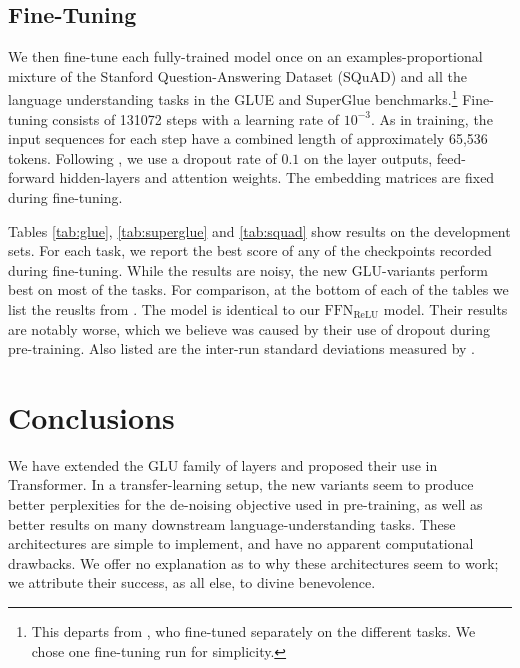 \subsection{Fine-Tuning}
We then fine-tune each fully-trained model once on an examples-proportional mixture of the Stanford Question-Answering Dataset (SQuAD) \citep{rajpurkar2016squad} and all the language understanding tasks in the GLUE \citep{wang2018glue} and SuperGlue \citep{wang2019superglue} benchmarks.\footnote{This departs from \citep{raffel2019exploring}, who fine-tuned separately on the different tasks.  We chose one fine-tuning run for simplicity.}  Fine-tuning consists of 131072 steps with a learning rate of $10^{-3}$.  As in training, the input sequences for each step have a combined length of approximately 65,536 tokens.  Following \citep{raffel2019exploring}, we use a dropout rate of $0.1$ on the layer outputs, feed-forward hidden-layers and attention weights.  The embedding matrices are fixed during fine-tuning.

Tables \ref{tab:glue}, \ref{tab:superglue} and \ref{tab:squad} show results on the development sets.  For each task, we report the best score of any of the checkpoints recorded during fine-tuning.  While the results are noisy, the new GLU-variants perform best on most of the tasks.  For comparison, at the bottom of each of the tables we list the reuslts from \citep{raffel2019exploring}.  The model is identical to our $\textrm{FFN}_\textrm{ReLU}$ model.  Their results are notably worse, which we believe was caused by their use of dropout during pre-training.  Also listed are the inter-run standard deviations measured by \citep{raffel2019exploring}.

\section{Conclusions}
We have extended the GLU family of layers and proposed their use in Transformer.  In a transfer-learning setup, the new variants seem to produce better perplexities for the de-noising objective used in pre-training, as well as better results on many downstream language-understanding tasks.  These architectures are simple to implement, and have no apparent computational drawbacks.  We offer no explanation as to why these architectures seem to work; we attribute their success, as all else, to divine benevolence.


